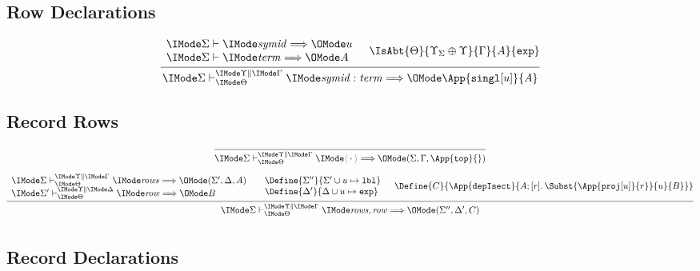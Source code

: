 \subsection*{Row Declarations\hfill {}}

\begin{gather}
  \infer{
    \ElabWthCtx{\Theta}{\Upsilon}{\Gamma}{\Sigma}{\ProdBind{\SortSymId}{\SortTerm}}{\App{\OpSingRcd{u}}{A}}
  }{
    \begin{array}{l}
      \Elab{\Sigma}{\SortSymId}{u}\\
      \Elab{\Sigma}{\SortTerm}{A}
    \end{array}&
    \IsAbt{\Theta}{\Upsilon_\Sigma\oplus\Upsilon}{\Gamma}{A}{\AbtSortExp}
  }
\end{gather}

\subsection*{Record Rows\hfill {}}

\begin{gather}
  \infer{
    \ElabWthCtx{\Theta}{\Upsilon}{\Gamma}{\Sigma}{\ProdEmptyCtx}{(\Sigma, \Gamma, \App{\OpTop}{})}
  }{}\\[6pt]
  \infer{
    \ElabWthCtx{\Theta}{\Upsilon}{\Gamma}{\Sigma}{\ProdExtendCtx{\SortRcdRows}{\SortRowDecl}}{
      (\Sigma'', \Delta', C)
    }
  }{
    \begin{array}{l}
      \ElabWthCtx{\Theta}{\Upsilon}{\Gamma}{\Sigma}{\SortRcdRows}{(\Sigma', \Delta, A)}\\
      \ElabWthCtx{\Theta}{\Upsilon}{\Delta}{\Sigma'}{\SortRowDecl}{B}
    \end{array} &
    \begin{array}{l}
      \Define{\Sigma''}{\Sigma'\cup u\mapsto\AbtSortLbl}\\
      \Define{\Delta'}{\Delta\cup u\mapsto\AbtSortExp}\\
    \end{array} &
    \Define{C}{
      \App{\OpDepIsect}{
        A;
        \MkAbs{}{r}{
          \Subst{
            \App{\OpProj{u}}{r}
          }{u}{B}
        }
      }
    }
  }\\[6pt]
\end{gather}

\subsection*{Record Declarations\hfill {}}

